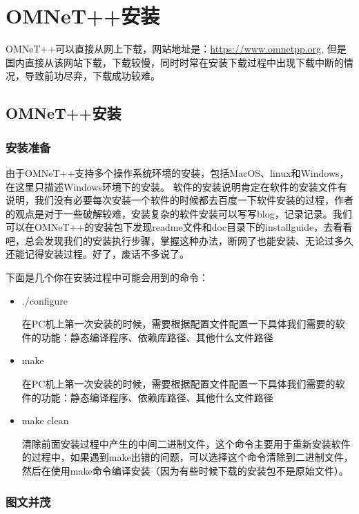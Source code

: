 \chapter{OMNeT++安装}

\begin{summary}
 OMNeT++可以直接从网上下载，网站地址是：\url{https://www.omnetpp.org},
 但是国内直接从该网站下载，下载较慢，同时时常在安装下载过程中出现下载中断的情况，导致前功尽弃，下载成功较难。\\
\end{summary}

\section{OMNeT++安装}

\subsection{安装准备}
由于OMNeT++支持多个操作系统环境的安装，包括MacOS、linux和Windows，在这里只描述Windows环境下的安装。
软件的安装说明肯定在软件的安装文件有说明，我们没有必要每次安装一个软件的时候都去百度一下软件安装的过程，作者的观点是对于一些破解较难，安装复杂的软件安装可以写写blog，记录记录。我们可以在OMNeT++的安装包下发现readme文件和doc目录下的installguide，去看看吧，总会发现我们的安装执行步骤，掌握这种办法，断网了也能安装、无论过多久还能记得安装过程。好了，废话不多说了。

下面是几个你在安装过程中可能会用到的命令：
\begin{itemize}
\item ./configure

在PC机上第一次安装的时候，需要根据配置文件配置一下具体我们需要的软件的功能：静态编译程序、依赖库路径、其他什么文件路径
\item make

在PC机上第一次安装的时候，需要根据配置文件配置一下具体我们需要的软件的功能：静态编译程序、依赖库路径、其他什么文件路径
\item make clean

清除前面安装过程中产生的中间二进制文件，这个命令主要用于重新安装软件的过程中，如果遇到make出错的问题，可以选择这个命令清除到二进制文件，然后在使用make命令编译安装（因为有些时候下载的安装包不是原始文件）。

\end{itemize}

\subsection{图文并茂}

